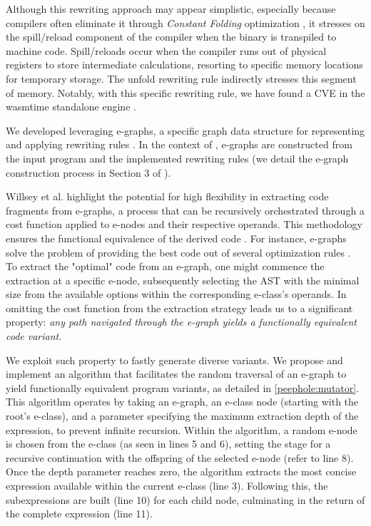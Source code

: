 

Although this rewriting approach may appear simplistic, especially because compilers often eliminate it through \emph{Constant Folding} optimization \cite{constant_folding}, it stresses on the spill/reload component of the compiler when the \Wasm binary is transpiled to machine code.
Spill/reloads occur when the compiler runs out of physical registers to store intermediate calculations, resorting to specific memory locations for temporary storage. 
The unfold rewriting rule indirectly stresses this segment of memory. 
Notably, with this specific rewriting rule, we have found a CVE in the wasmtime standalone engine \cite{CVE}.




We developed \tool leveraging e-graphs, a specific graph data structure for representing and applying rewriting rules \cite{10.1145/3571207}. 
In the context of \tool, e-graphs are constructed from the input \Wasm program and the implemented rewriting rules (we detail the e-graph construction process in Section 3 of \cite{wasmmutate}).

Willsey et al. highlight the potential for high flexibility in extracting code fragments from e-graphs, a process that can be recursively orchestrated through a cost function applied to e-nodes and their respective operands.
This methodology ensures the functional equivalence of the derived code \cite{e-graph}. 
For instance, e-graphs solve the problem of providing the best code out of several optimization rules \cite{10.1145/1480881.1480915}.
To extract the "optimal" code from an e-graph, one might commence the extraction at a specific e-node, subsequently selecting the AST with the minimal size from the available options within the corresponding e-class's operands.
In \too omitting the cost function from the extraction strategy leads us to a significant property: \emph{any path navigated through the e-graph yields a functionally equivalent code variant}. 

We exploit such property to fastly generate diverse \Wasm variants.
We propose and implement an algorithm that facilitates the random traversal of an e-graph to yield functionally equivalent program variants, as detailed in \autoref{peephole:mutator}. 
This algorithm operates by taking an e-graph, an e-class node (starting with the root's e-class), and a parameter specifying the maximum extraction depth of the expression, to prevent infinite recursion.
Within the algorithm, a random e-node is chosen from the e-class (as seen in lines 5 and 6), setting the stage for a recursive continuation with the offspring of the selected e-node (refer to line 8). 
Once the depth parameter reaches zero, the algorithm extracts the most concise expression available within the current e-class (line 3). 
Following this, the subexpressions are built (line 10) for each child node, culminating in the return of the complete expression (line 11).


